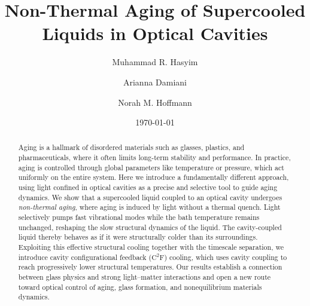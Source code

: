 \documentclass[aps, prl,
 reprint,
 superscriptaddress,
 citeautoscript,
 amsmath,amssymb,
 tightenlines
]{revtex4-2}
\begin{document}

\title{Non-Thermal Aging of Supercooled Liquids in Optical Cavities}

\author{Muhammad R. Hasyim}

\author{Arianna Damiani}


\author{Norah M. Hoffmann}


\date{\today}

\begin{abstract}

\noindent Aging is a hallmark of disordered materials such as glasses, plastics, and pharmaceuticals, where it often limits long-term stability and performance. In practice, aging is controlled through global parameters like temperature or pressure, which act uniformly on the entire system. Here we introduce a fundamentally different approach, using light confined in optical cavities as a precise and selective tool to guide aging dynamics. We show that a supercooled liquid coupled to an optical cavity undergoes \emph{non-thermal aging}, where aging is induced by light without a thermal quench. Light selectively pumps fast vibrational modes while the bath temperature remains unchanged, reshaping the slow structural dynamics of the liquid. The cavity-coupled liquid thereby behaves as if it were structurally colder than its surroundings.
Exploiting this effective structural cooling together with the timescale separation, we introduce cavity configurational feedback ($\mathrm{C^2F}$) cooling, which uses cavity coupling to reach progressively lower structural temperatures. Our results establish a connection between glass physics and strong light–matter interactions and open a new route toward optical control of aging, glass formation, and nonequilibrium materials dynamics.

\end{abstract}

                            
\maketitle
\end{document}

